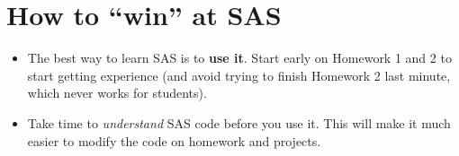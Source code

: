 \documentclass[12pt]{../notes}
\begin{document}
\section{How to ``win'' at SAS}
\begin{itemize}
\item The best way to learn SAS is to \textbf{use it}. Start early on Homework 1 and 2 to start getting experience (and avoid trying to finish Homework 2 last minute, which never works for students). 
\item Take time to \textit{understand} SAS code before you use it. This will make it much easier to modify the code on homework and projects. 
\end{itemize}




\end{document}

